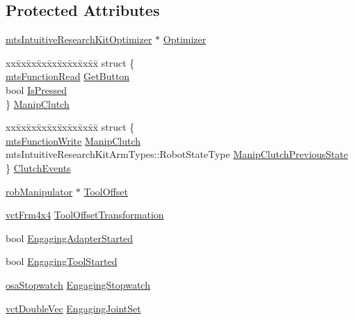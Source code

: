 \subsection*{Protected Attributes}
\begin{DoxyCompactItemize}
\item 
\hyperlink{classmts_intuitive_research_kit_optimizer}{mts\-Intuitive\-Research\-Kit\-Optimizer} $\ast$ \hyperlink{classmts_intuitive_research_kit_p_s_m_a3ca72df1e884e0d754b6ac688f0715f0}{Optimizer}
\item 
\begin{tabbing}
xx\=xx\=xx\=xx\=xx\=xx\=xx\=xx\=xx\=\kill
struct \{\\
\>\hyperlink{classmts_function_read}{mtsFunctionRead} \hyperlink{classmts_intuitive_research_kit_p_s_m_aa4f1aaa075c8c71a96ddcba9336d0e0a}{GetButton}\\
\>bool \hyperlink{classmts_intuitive_research_kit_p_s_m_a78a247dc70ea5b9a26a2bd40be409e16}{IsPressed}\\
\} \hyperlink{classmts_intuitive_research_kit_p_s_m_aae21cc42355a3f6c4d1d5fa178bad683}{ManipClutch}\\

\end{tabbing}\item 
\begin{tabbing}
xx\=xx\=xx\=xx\=xx\=xx\=xx\=xx\=xx\=\kill
struct \{\\
\>\hyperlink{classmts_function_write}{mtsFunctionWrite} \hyperlink{classmts_intuitive_research_kit_p_s_m_a02491aec085bb8e079ea0ec2dc11b278}{ManipClutch}\\
\>mtsIntuitiveResearchKitArmTypes::RobotStateType \hyperlink{classmts_intuitive_research_kit_p_s_m_ab4a9f5daf47990c0b59c433775aba897}{ManipClutchPreviousState}\\
\} \hyperlink{classmts_intuitive_research_kit_p_s_m_a037563e9ef5ec7c82a9cff4d0b10941e}{ClutchEvents}\\

\end{tabbing}\item 
\hyperlink{classrob_manipulator}{rob\-Manipulator} $\ast$ \hyperlink{classmts_intuitive_research_kit_p_s_m_ab07541283bf0eee9126789cc3391f46b}{Tool\-Offset}
\item 
\hyperlink{vct_transformation_types_8h_a33da47f4deb2556b37a69a2c44b29d75}{vct\-Frm4x4} \hyperlink{classmts_intuitive_research_kit_p_s_m_ac57150a5c372984cffcc8e4f4c8c1203}{Tool\-Offset\-Transformation}
\item 
bool \hyperlink{classmts_intuitive_research_kit_p_s_m_a40572bf4e0ae1c3b9a5085982c4f6887}{Engaging\-Adapter\-Started}
\item 
bool \hyperlink{classmts_intuitive_research_kit_p_s_m_a50f8d217f7b667f6c06d95ae9287f4a6}{Engaging\-Tool\-Started}
\item 
\hyperlink{classosa_stopwatch}{osa\-Stopwatch} \hyperlink{classmts_intuitive_research_kit_p_s_m_a8c83ae174dd75444a8d47255dfbb96a1}{Engaging\-Stopwatch}
\item 
\hyperlink{vct_dynamic_vector_types_8h_ade4b3068c86fb88f41af2e5187e491c2}{vct\-Double\-Vec} \hyperlink{classmts_intuitive_research_kit_p_s_m_a6fa3319edb299cfbca1aed10ae681385}{Engaging\-Joint\-Set}
\end{DoxyCompactItemize}
